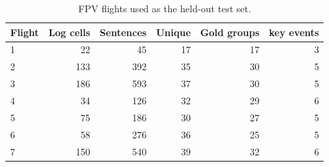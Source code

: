 \begin{table}[t]
\centering
\caption{FPV flights used as the held-out test set.}
\label{tab:fpv_flights}
\small
\begin{tabular}{lrrrrr}
\toprule
Flight & Log cells & Sentences & Unique & Gold groups & key events \\
\midrule
1 & 22 & 45 & 17 & 17 & 3 \\
2 & 133 & 392 & 35 & 30 & 5 \\
3 & 186 & 593 & 37 & 30 & 5 \\
4 & 34 & 126 & 32 & 29 & 6 \\
5 & 75 & 186 & 30 & 27 & 5 \\
6 & 58 & 276 & 36 & 25 & 5 \\
7 & 150 & 540 & 39 & 32 & 6 \\
\bottomrule
\end{tabular}
\end{table}